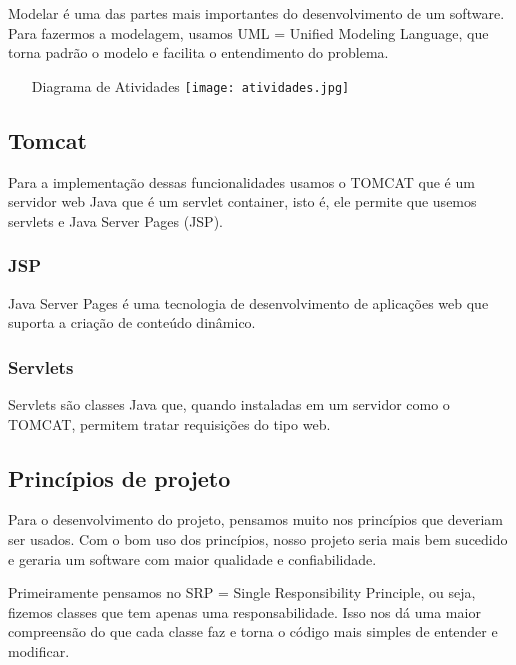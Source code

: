 \documentclass[12pt]{article}
\begin{document}
			Modelar é uma das partes mais importantes do desenvolvimento de um software. Para fazermos a modelagem, usamos UML = Unified Modeling Language, que torna padrão o modelo e facilita o entendimento do problema.

			\begin{enumerate}

				\item[Diagrama de Atividades]
					\texttt{[image: atividades.jpg]}
			\end{enumerate}
		\subsection{Tomcat}

			Para a implementação dessas funcionalidades usamos o TOMCAT que é um servidor web Java que é um servlet container, isto é, ele permite que usemos servlets e Java Server Pages (JSP).

			\subsubsection{JSP}

				Java Server Pages é uma tecnologia de desenvolvimento de aplicações web que suporta a criação de conteúdo dinâmico.

			\subsubsection{Servlets}

				Servlets são classes Java que, quando instaladas em um servidor como o TOMCAT, permitem tratar requisições do tipo web.

		\subsection{Princípios de projeto}

			Para o desenvolvimento do projeto, pensamos muito nos princípios que deveriam ser usados. Com o bom uso dos princípios, nosso projeto seria mais bem sucedido e geraria um software com maior qualidade e confiabilidade.

			Primeiramente pensamos no SRP = Single Responsibility Principle, ou seja, fizemos classes que tem apenas uma responsabilidade. Isso nos dá uma maior compreensão do que cada classe faz e torna o código mais simples de entender e modificar.
\end{document}
